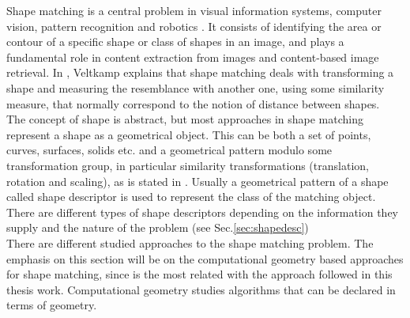 Shape matching is a central problem in visual information systems,
computer vision, pattern recognition and robotics \cite{matchingbook}. 
It consists of identifying the area or contour of a specific
shape or class of shapes in an image, and plays a fundamental
role in content extraction from images and content-based image
retrieval. In \cite{matching2}, Veltkamp explains that shape 
matching deals with transforming a shape and measuring the 
resemblance with another one, using some similarity measure, that 
normally correspond to the notion of distance between shapes.\\
The concept of shape is abstract, but most approaches in 
shape matching represent a shape as a geometrical object.
This can be both a set of points, curves, surfaces, solids etc.
and a geometrical pattern modulo some transformation group,
in particular similarity transformations (translation, rotation 
and scaling), as is stated in \cite{matching2}. Usually a
geometrical pattern of a shape called shape descriptor
is used to represent the class of the matching object. There are
different types of shape descriptors depending on the information
they supply and the nature of the problem (see Sec.\ref{sec:shapedesc}) \\

There are different studied approaches to the shape matching 
problem. The emphasis on this section will be on the computational
geometry based approaches for shape matching, since is the most related with
the approach followed in this thesis work. Computational
geometry studies algorithms that can be declared in terms of 
geometry.\\

